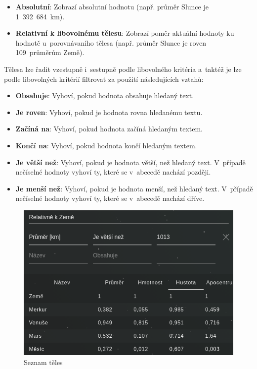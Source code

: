 \documentclass[a4paper,12pt]{article}
\begin{document}
\begin{itemize}
\item \textbf{Absolutní}: Zobrazí absolutní hodnotu (např. průměr Slunce je 1~392~684~km).
\item \textbf{Relativní k libovolnému tělesu}: Zobrazí poměr aktuální hodnoty ku hodnotě u~porovnávaního tělesa (např. průměr Slunce je roven 109~průměrům Země).
\end{itemize}

Tělesa lze řadit vzestupně i~sestupně podle libovolného kritéria a~taktéž je lze podle libovolných kritérií filtrovat za použití následujících vztahů:

\begin{itemize}
\item \textbf{Obsahuje}: Vyhoví, pokud hodnota obsahuje hledaný text.
\item \textbf{Je roven}: Vyhoví, pokud je hodnota rovna hledanému textu.
\item \textbf{Začíná na}: Vyhoví, pokud hodnota začíná hledaným textem.
\item \textbf{Končí na}: Vyhoví, pokud hodnota končí hledaným textem.
\item \textbf{Je větší než}: Vyhoví, pokud je hodnota větší, než hledaný text. V~případě nečíselné hodnoty vyhoví ty, které se v~abecedě nachází později.
\item \textbf{Je menší než}: Vyhoví, pokud je hodnota menší, než hledaný text. V~případě nečíselné hodnoty vyhoví ty, které se v~abecedě nachází dříve.
\end{itemize} 

\begin{figure}[H]
\begin{center}
\includegraphics[width=350pt]{Images/Bodies.png}
\caption{Seznam těles}
\end{center}
\end{figure}
\end{document}
